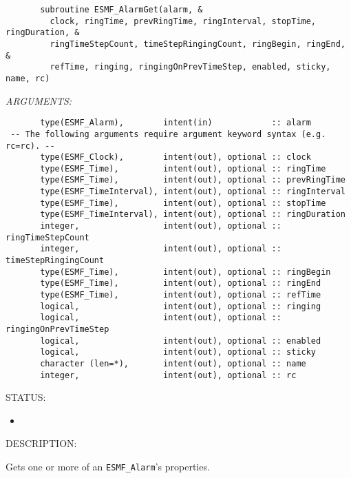  
\begin{verbatim}       subroutine ESMF_AlarmGet(alarm, &
         clock, ringTime, prevRingTime, ringInterval, stopTime, ringDuration, &
         ringTimeStepCount, timeStepRingingCount, ringBegin, ringEnd, &
         refTime, ringing, ringingOnPrevTimeStep, enabled, sticky, name, rc)
 \end{verbatim}{\em ARGUMENTS:}
\begin{verbatim}       type(ESMF_Alarm),        intent(in)            :: alarm
 -- The following arguments require argument keyword syntax (e.g. rc=rc). --
       type(ESMF_Clock),        intent(out), optional :: clock
       type(ESMF_Time),         intent(out), optional :: ringTime
       type(ESMF_Time),         intent(out), optional :: prevRingTime
       type(ESMF_TimeInterval), intent(out), optional :: ringInterval
       type(ESMF_Time),         intent(out), optional :: stopTime
       type(ESMF_TimeInterval), intent(out), optional :: ringDuration
       integer,                 intent(out), optional :: ringTimeStepCount
       integer,                 intent(out), optional :: timeStepRingingCount
       type(ESMF_Time),         intent(out), optional :: ringBegin
       type(ESMF_Time),         intent(out), optional :: ringEnd
       type(ESMF_Time),         intent(out), optional :: refTime
       logical,                 intent(out), optional :: ringing
       logical,                 intent(out), optional :: ringingOnPrevTimeStep
       logical,                 intent(out), optional :: enabled
       logical,                 intent(out), optional :: sticky
       character (len=*),       intent(out), optional :: name
       integer,                 intent(out), optional :: rc
 \end{verbatim}
{\sf STATUS:}
   \begin{itemize}
   \item{}
   \end{itemize}
  
{\sf DESCRIPTION:\\ }


       Gets one or more of an {\tt ESMF\_Alarm}'s properties.
  
